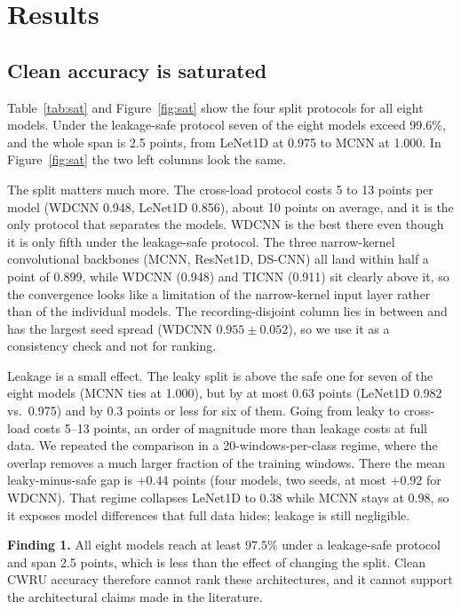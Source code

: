 \section{Results}

\subsection{Clean accuracy is saturated}

Table~\ref{tab:sat} and Figure~\ref{fig:sat} show the four split protocols for all eight models. Under the leakage-safe protocol seven of the eight models exceed 99.6\%, and the whole span is 2.5 points, from LeNet1D at 0.975 to MCNN at 1.000. In Figure~\ref{fig:sat} the two left columns look the same.

The split matters much more. The cross-load protocol costs 5 to 13 points per model (WDCNN 0.948, LeNet1D 0.856), about 10 points on average, and it is the only protocol that separates the models. WDCNN is the best there even though it is only fifth under the leakage-safe protocol. The three narrow-kernel convolutional backbones (MCNN, ResNet1D, DS-CNN) all land within half a point of 0.899, while WDCNN (0.948) and TICNN (0.911) sit clearly above it, so the convergence looks like a limitation of the narrow-kernel input layer rather than of the individual models. The recording-disjoint column lies in between and has the largest seed spread (WDCNN $0.955\pm0.052$), so we use it as a consistency check and not for ranking.

Leakage is a small effect. The leaky split is above the safe one for seven of the eight models (MCNN ties at 1.000), but by at most 0.63 points (LeNet1D 0.982 vs.\ 0.975) and by 0.3 points or less for six of them. Going from leaky to cross-load costs 5--13 points, an order of magnitude more than leakage costs at full data. We repeated the comparison in a 20-windows-per-class regime, where the overlap removes a much larger fraction of the training windows. There the mean leaky-minus-safe gap is $+0.44$ points (four models, two seeds, at most $+0.92$ for WDCNN). That regime collapses LeNet1D to 0.38 while MCNN stays at 0.98, so it exposes model differences that full data hides; leakage is still negligible.

\textbf{Finding 1.} All eight models reach at least $97.5\%$ under a leakage-safe protocol and span 2.5 points, which is less than the effect of changing the split. Clean CWRU accuracy therefore cannot rank these architectures, and it cannot support the architectural claims made in the literature.

